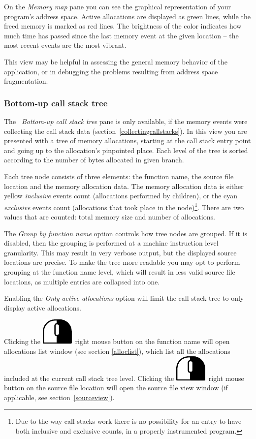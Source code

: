 \documentclass[hidelinks,titlepage,a4paper]{article}
\newcommand{\RMB}{\includegraphics[height=.8\baselineskip]{icons/rmb}}
\begin{document}
On the \emph{\faMap{} Memory map} pane you can see the graphical representation of your program's address space. Active allocations are displayed as green lines, while the freed memory is marked as red lines. The brightness of the color indicates how much time has passed since the last memory event at the given location -- the most recent events are the most vibrant.

This view may be helpful in assessing the general memory behavior of the application, or in debugging the problems resulting from address space fragmentation.

\subsubsection{Bottom-up call stack tree}
\label{callstacktree}

The \emph{\faAlignJustify{}~Bottom-up call stack tree} pane is only available, if the memory events were collecting the call stack data (section~\ref{collectingcallstacks}). In this view you are presented with a tree of memory allocations, starting at the call stack entry point and going up to the allocation's pinpointed place. Each level of the tree is sorted according to the number of bytes allocated in given branch.

Each tree node consists of three elements: the function name, the source file location and the memory allocation data. The memory allocation data is either yellow \emph{inclusive} events count (allocations performed by children), or the cyan \emph{exclusive} events count (allocations that took place in the node)\footnote{Due to the way call stacks work there is no possibility for an entry to have both inclusive and exclusive counts, in a properly instrumented program.}. There are two values that are counted: total memory size and number of allocations.

The \emph{Group by function name} option controls how tree nodes are grouped. If it is disabled, then the grouping is performed at a machine instruction level granularity. This may result in very verbose output, but the displayed source locations are precise. To make the tree more readable you may opt to perform grouping at the function name level, which will result in less valid source file locations, as multiple entries are collapsed into one.

Enabling the \emph{Only active allocations} option will limit the call stack tree to only display active allocations.

Clicking the \RMB{}~right mouse button on the function name will open allocations list window (see section \ref{alloclist}), which list all the allocations included at the current call stack tree level. Clicking the \RMB{}~right mouse button on the source file location will open the source file view window (if applicable, see section~\ref{sourceview}).
\end{document}
